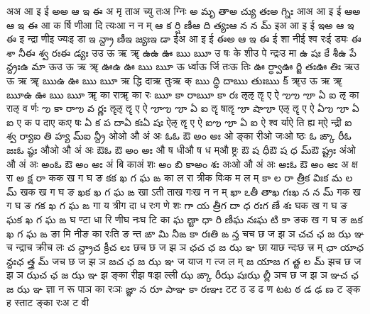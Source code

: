 \documentclass{article}
\begin{document}
\card
{अ}{अ आ इ ई}%
{అ}{అ ఆ ఇ ఈ}
{{अ मृ ता}{अ च्यु तः}{अ ग्निः}}%
{{అ మృ తా}{అ చ్యు తః}{అ గ్నిః}}
\card
{आ}{अ आ इ ई}%
{ఆ}{అ ఆ ఇ ఈ}
{{आ क र्षि णी}{आ दि त्यः}{आ न न म्}}%
{{ఆ క ర్షి ణీ}{ఆ ది త్యః}{ఆ న న మ్}}
\card
{इ}{अ आ इ ई}%
{ఇ}{అ ఆ ఇ ఈ}
{{इ न्द्रा णी}{इ ज्यः}{इ डा}}%
{{ఇ న్ద్రా ణీ}{ఇ జ్యః}{ఇ డా}}
\card
{ई}{अ आ इ ई}%
{ఈ}{అ ఆ ఇ ఈ}
{{ई शा नी}{ई श्व रः}{ई ड्यः}}%
{{ఈ శా నీ}{ఈ శ్వ రః}{ఈ డ్యః}}
\card
{उ}{उ ऊ ऋ ॠ}%
{ఉ}{ఉ ఊ ఋ ౠ}
{{उ षः के शी}{उ पे न्द्रः}{उ मा}}%
{{ఉ షః కే శీ}{ఉ పే న్ద్రః}{ఉ మా}}
\card
{ऊ}{उ ऊ ऋ ॠ}%
{ఊ}{ఉ ఊ ఋ ౠ}
{{ऊ र्ध्वा}{ऊ र्जि तः}{ऊ तिः}}%
{{ఊ ర్ధ్వా}{ఊ ర్జి తః}{ఊ తిః}}
\card
{ऋ}{उ ऊ ऋ ॠ}%
{ఋ}{ఉ ఊ ఋ ౠ}
{{ऋ द्धि दा}{ऋ तुः}{ऋ क्}}%
{{ఋ ద్ధి దా}{ఋ తుః}{ఋ క్}}
\card
{ॠ}{उ ऊ ऋ ॠ}%
{ౠ}{ఉ ఊ ఋ ౠ}
{{ॠ का रा}{ॠ का रः}{ }}%
{{ౠ కా రా}{ౠ కా రః}{ }}
\card
{ऌ}{ऌ ॡ ए ऐ}%
{ఌ}{ఌ ౡ ఏ ఐ}
{{ऌ का रा}{ऌ व र्णः}{ }}%
{{ఌ కా రా}{ఌ వ ర్ణః}{ }}
\card
{ॡ}{ऌ ॡ ए ऐ}%
{ౡ}{ఌ ౡ ఏ ఐ}
{{ॡ षा}{ॡ}{ }}%
{{ౡ షా}{ౡ}{ }}
\card
{ए}{ऌ ॡ ए ऐ}%
{ఏ}{ఌ ౡ ఏ ఐ}
{{ए क प दा}{ए कः}{ए षः}}%
{{ఏ క ప దా}{ఏ కః}{ఏ షః}}
\card
{ऐ}{ऌ ॡ ए ऐ}%
{ఐ}{ఌ ౡ ఏ ఐ}
{{ऐ श्व र्या}{ऐ ति ह्य म्}{ऐ न्द्री}}%
{{ఐ శ్వ ర్యా}{ఐ తి హ్య మ్}{ఐ న్ద్రీ}}
\card
{ओ}{ओ औ अं अः}%
{ఓ}{ఓ ఔ అం అః}
{{ओ ङ्का री}{ओ जः}{ओ ष्ठः}}%
{{ఓ ఙ్కా రీ}{ఓ జః}{ఓ ష్ఠః}}
\card
{औ}{ओ औ अं अः}%
{ఔ}{ఓ ఔ అం అః}
{{औ ष धी}{औ ष ध म्}{औ ष्ट्रः}}%
{{ఔ ష ధీ}{ఔ ష ధ మ్}{ఔ ష్ట్రః}}
\card
{अं}{ओ औ अं अः}%
{అం}{ఓ ఔ అం అః}
{{अं बि का}{अं शः}{ }}%
{{అం బి కా}{అం శః}{ }}
\card
{अः}{ओ औ अं अः}%
{అః}{ఓ ఔ అం అః}
{{अ क्ष रा}{ }{ }}%
{{అ క్ష రా}{ }{ }}
\card
{क}{क ख ग घ ङ}%
{క}{క ఖ గ ఘ ఙ}
{{का ल रा त्री}{क विः}{क म ल म्}}%
{{కా ల రా త్రీ}{క విః}{క మ ల మ్}}
\card
{ख}{क ख ग घ ङ}%
{ఖ}{క ఖ గ ఘ ఙ}
{{खा ऽती ता}{ख गः}{ख न न म्}}%
{{ఖా ఽతీ తా}{ఖ గః}{ఖ న న మ్}}
\card
{ग}{क ख ग घ ङ}%
{గ}{క ఖ గ ఘ ఙ}
{{गा य त्री}{ग दा ध रः}{ग णे शः}}%
{{గా య త్రీ}{గ దా ధ రః}{గ ణే శః}}
\card
{घ}{क ख ग घ ङ}%
{ఘ}{క ఖ గ ఘ ఙ}
{{घ ण्टा धा रि णी}{घ नः}{घ टि का}}%
{{ఘ ణ్టా ధా రి ణీ}{ఘ నః}{ఘ టి కా}}
\card
{ङ}{क ख ग घ ङ}%
{ఙ}{క ఖ గ ఘ ఙ}
{{ङा मि नी}{ङ का रः}{ति ङ न्त}}%
{{ఙా మి నీ}{ఙ కా రః}{తి ఙ న్త}}
\card
{च}{च छ ज झ ञ}%
{చ}{చ ఛ జ ఝ ఞ}
{{च न्द्रा}{च क्री}{च लः}}%
{{చ న్ద్రా}{చ క్రీ}{చ లః}}
\card
{छ}{च छ ज झ ञ}%
{ఛ}{చ ఛ జ ఝ ఞ}
{{छा या}{छ न्दः}{छ त्त्र म्}}%
{{ఛా యా}{ఛ న్దః}{ఛ త్త్ర మ్}}
\card
{ज}{च छ ज झ ञ}%
{జ}{చ ఛ జ ఝ ఞ}
{{ज या}{ज ग त्}{ज ल म्}}%
{{జ యా}{జ గ త్}{జ ల మ్}}
\card
{झ}{च छ ज झ ञ}%
{ఝ}{చ ఛ జ ఝ ఞ}
{{झ ङ्का री}{झ षः}{झ ल्ली}}%
{{ఝ ఙ్కా రీ}{ఝ షః}{ఝ ల్లీ}}
\card
{ञ}{च छ ज झ ञ}%
{ఞ}{చ ఛ జ ఝ ఞ}
{{ज्ञा न रू पा}{ञ का रः}{ञः}}%
{{జ్ఞా న రూ పా}{ఞ కా రః}{ఞః}}
\card
{ट}{ट ठ ड ढ ण}%
{ట}{ట ఠ డ ఢ ణ}
{{ट ङ्क ह स्ता}{ट ङ्का रः}{अ ट वी}}%
\end{document}
